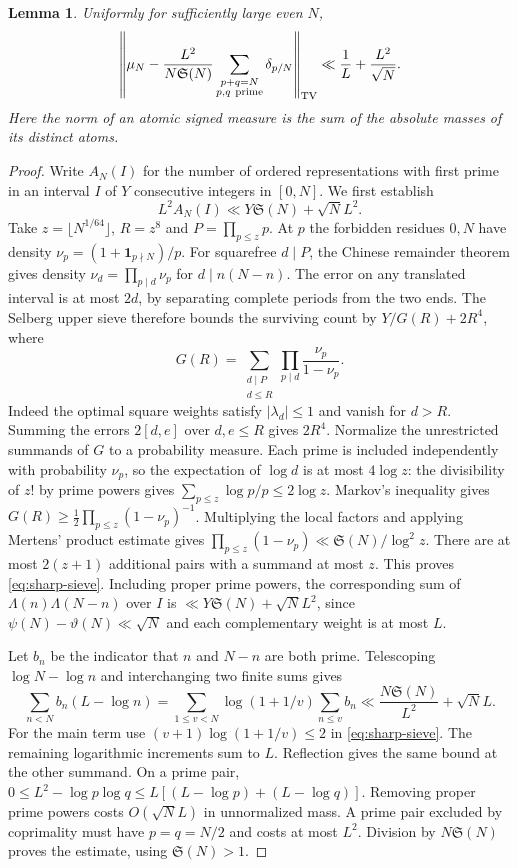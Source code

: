 \documentclass[11pt,a4paper]{article}
\newtheorem{lemma}[theorem]{Lemma}
\newcommand{\SSg}{\mathfrak S}
\newcommand{\one}{\mathbf 1}
\begin{document}
\begin{lemma}\label{lm:totalvar}
Uniformly for sufficiently large even $N$,
\[
 \left\|\mu_N-\frac{L^2}{N\SSg(N)}
       \sum_{\substack{p+q=N\\p,q\ {\rm prime}}}\delta_{p/N}
       \right\|_{\mathrm{TV}}
 \ll \frac1L+\frac{L^2}{\sqrt N}.
\]
Here the norm of an atomic signed measure is the sum of the absolute masses of its distinct atoms.
\end{lemma}
\begin{proof}
Write $A_N(I)$ for the number of ordered representations with first prime in an interval $I$ of $Y$ consecutive integers in $[0,N]$. We first establish
\begin{equation}\label{eq:sharp-sieve}
 L^2 A_N(I)\ll Y\SSg(N)+\sqrt N L^2.
\end{equation}
Take $z=\lfloor N^{1/64}\rfloor$, $R=z^8$ and $P=\prod_{p\le z}p$. At $p$ the forbidden residues $0,N$ have density $\nu_p=(1+\one_{p\nmid N})/p$. For squarefree $d\mid P$, the Chinese remainder theorem gives density $\nu_d=\prod_{p\mid d}\nu_p$ for $d\mid n(N-n)$. The error on any translated interval is at most $2d$, by separating complete periods from the two ends. The Selberg upper sieve therefore bounds the surviving count by $Y/G(R)+2R^4$, where
\[
 G(R)=\sum_{\substack{d\mid P\\d\le R}}\prod_{p\mid d}\frac{\nu_p}{1-\nu_p}.
\]
Indeed the optimal square weights satisfy $|\lambda_d|\le1$ and vanish for $d>R$. Summing the errors $2[d,e]$ over $d,e\le R$ gives $2R^4$. Normalize the unrestricted summands of $G$ to a probability measure. Each prime is included independently with probability $\nu_p$, so the expectation of $\log d$ is at most $4\log z$: the divisibility of $z!$ by prime powers gives $\sum_{p\le z}\log p/p\le2\log z$. Markov's inequality gives $G(R)\ge\frac12\prod_{p\le z}(1-\nu_p)^{-1}$. Multiplying the local factors and applying Mertens' product estimate gives $\prod_{p\le z}(1-\nu_p)\ll\SSg(N)/\log^2z$. There are at most $2(z+1)$ additional pairs with a summand at most $z$. This proves \eqref{eq:sharp-sieve}. Including proper prime powers, the corresponding sum of $\Lambda(n)\Lambda(N-n)$ over $I$ is $\ll Y\SSg(N)+\sqrt N L^2$, since $\psi(N)-\vartheta(N)\ll\sqrt N$ and each complementary weight is at most $L$.

Let $b_n$ be the indicator that $n$ and $N-n$ are both prime. Telescoping $\log N-\log n$ and interchanging two finite sums gives
\[
 \sum_{n<N} b_n(L-\log n)
 =\sum_{1\le v<N}\log(1+1/v)\sum_{n\le v}b_n
 \ll \frac{N\SSg(N)}{L^2}+\sqrt N L.
\]
For the main term use $(v+1)\log(1+1/v)\le2$ in \eqref{eq:sharp-sieve}. The remaining logarithmic increments sum to $L$. Reflection gives the same bound at the other summand. On a prime pair,
$0\le L^2-\log p\log q\le L[(L-\log p)+(L-\log q)]$.
Removing proper prime powers costs $O(\sqrt N L)$ in unnormalized mass. A prime pair excluded by coprimality must have $p=q=N/2$ and costs at most $L^2$. Division by $N\SSg(N)$ proves the estimate, using $\SSg(N)>1$.
\end{proof}
\end{document}
